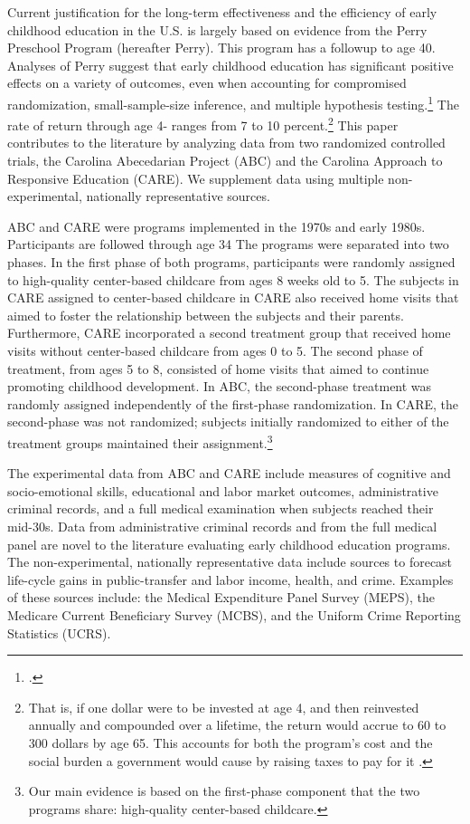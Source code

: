 Current justification for the long-term effectiveness and the efficiency of early childhood education in the U.S. is largely based on evidence from the Perry Preschool Program (hereafter Perry). This program has a followup to age 40. Analyses of Perry suggest that early childhood education has significant positive effects on a variety of outcomes, even when accounting for compromised randomization, small-sample-size inference, and multiple hypothesis testing.\footnote{\cite{Heckman_Moon_etal_2010_QE}.} The rate of return through age 4- ranges from 7 to 10 percent.\footnote{That is, if one dollar were to be invested at age 4, and then reinvested annually and compounded over a lifetime, the return would accrue to 60 to 300 dollars by age 65. This accounts for both the program's cost and the social burden a government would cause by raising taxes to pay for it \citep{Heckman_Moon_etal_2010_RateofReturn}.} This paper contributes to the literature by analyzing data from two randomized controlled trials, the Carolina Abecedarian Project (ABC) and the Carolina Approach to Responsive Education (CARE). We supplement data using multiple non-experimental, nationally representative sources.

ABC and CARE were programs implemented in the 1970s and early 1980s. Participants are followed through age 34 The programs were separated into two phases. In the first phase of both programs, participants were randomly assigned to high-quality center-based childcare from ages 8 weeks old to 5. The subjects in CARE assigned to center-based childcare in CARE also received home visits that aimed to foster the relationship between the subjects and their parents. Furthermore, CARE incorporated a second treatment group that received home visits without center-based childcare from ages 0 to 5. The second phase of treatment, from ages 5 to 8, consisted of home visits that aimed to continue promoting childhood development. In ABC, the second-phase treatment was randomly assigned independently of the first-phase randomization. In CARE, the second-phase was not randomized; subjects initially randomized to either of the treatment groups maintained their assignment.\footnote{Our main evidence is based on the first-phase component that the two programs share: high-quality center-based childcare.}

The experimental data from ABC and CARE include measures of cognitive and socio-emotional skills, educational and labor market outcomes, administrative criminal records, and a full medical examination when subjects reached their mid-30s. Data from administrative criminal records and from the full medical panel are novel to the literature evaluating early childhood education programs. The non-experimental, nationally representative data include sources to forecast life-cycle gains in public-transfer and labor income, health, and crime. Examples of these sources include: the Medical Expenditure Panel Survey (MEPS), the Medicare Current Beneficiary Survey (MCBS), and the Uniform Crime Reporting Statistics (UCRS).

